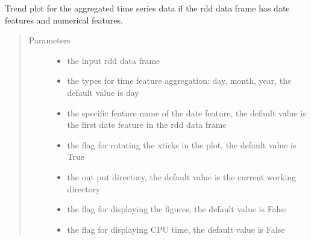 \documentclass[letterpaper,12pt,english]{sphinxmanual}
\begin{document}
\begin{fulllineitems}
Trend plot for the aggregated time series data if the rdd data frame has date features and numerical features.
\begin{quote}\begin{description}
\item[{Parameters}] \leavevmode\begin{itemize}
\item {} 
 \textendash{} the input rdd data frame

\item {} 
 \textendash{} the types for time feature aggregation: day, month, year, the default value is day

\item {} 
 \textendash{} the specific feature name of the date feature, the default value
is the first date feature in the rdd data frame

\item {} 
 \textendash{} the flag for rotating the xticks in the plot, the default value is True

\item {} 
 \textendash{} the out put directory, the default value is the current working directory

\item {} 
 \textendash{} the flag for displaying the figures, the default value is False

\item {} 
 \textendash{} the flag for displaying CPU time, the default value is False

\end{itemize}

\end{description}\end{quote}

\end{fulllineitems}
\end{document}
